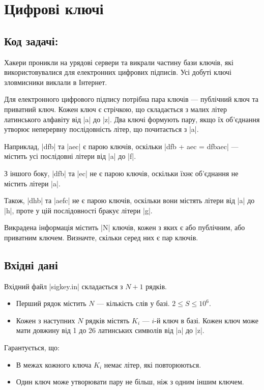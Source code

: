 \documentclass[12pt,a4paper]{article}
\begin{document}
\section*{Цифрові ключі \hfill {}}


\subsection*{Код задачі: }

Хакери проникли на урядові сервери та викрали частину бази ключів, які використовувалися для електронних цифрових підписів.
Усі добуті ключі зловмисники виклали в Інтернет.

Для електронного цифрового підпису потрібна пара ключів --- публічний ключ та приватний ключ. Кожен ключ є стрічкою, що складається з малих літер латинського алфавіту від |a| до |z|. Два ключі формують пару, якщо їх об’єднання утворює неперервну послідовність літер, що почитається з |a|.

Наприклад, |dfb| та |aec| є парою ключів, оскільки |dfb + aec = dfbaec| --- містить усі послідовні літери від |a| до |f|.

З іншого боку, |dfb| та |ec| не є парою ключів, оскільки їхнє об'єднання не містить літери |a|.

Також, |dhb| та |aefc| не є парою ключів, оскільки вони містять літери від |a| до |h|, проте у цій послідовності бракує літери |g|.

Викрадена інформація містить |N| ключів, кожен з яких є або публічним, або приватним ключем. Визначте, скільки серед них є пар ключів.


\subsection*{Вхідні дані}

Вхідний файл |sigkey.in| складається з \(N + 1\) рядків.

\begin{itemize}
    \item Перший рядок містить \(N\) --- кількість слів у базі. \(2 \leq S \leq 10^6 \).
    \item Кожен з наступних \(N\) рядків містять \(K_i\) --- \(i\)-й ключ в базі. Кожен ключ може мати довжину від 1 до 26 латинських символів від |a| до |z|.
\end{itemize}

Гарантується, що:
\begin{itemize}
    \item В межах кожного ключа \(K_i\) немає літер, які повторюються.
    \item Один ключ може утворювати пару не більш, ніж з одним іншим ключем.
\end{itemize}
\end{document}
